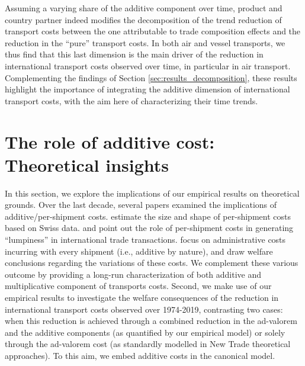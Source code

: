 \documentclass[a4paper,11pt]{article}
\begin{document}
Assuming a varying share of the additive component over time, product and country partner indeed modifies the decomposition of the trend reduction of transport costs between the one attributable to trade composition effects and the reduction in the ``pure'' transport costs.
In both air and vessel transports, we thus find that this last dimension is the main driver of the reduction in international transport costs observed over time, in particular in air transport.
Complementing the findings of Section \ref{sec:results_decomposition}, these results highlight the importance of integrating the additive dimension of international transport costs, with the aim here of characterizing their time trends.

\section{The role of additive cost: Theoretical insights}\label{sec:theory}


In this section, we explore the implications of our empirical results on theoretical grounds. Over the last decade, several papers examined the implications of additive/per-shipment costs. \cite{Kropf-Saure-JIE-2016} estimate the size and shape of per-shipment costs based on Swiss data. \cite{Alessandria-et-al-AER-2010} and \cite{Hornok-et-al-RES-2015} point out the role of per-shipment costs in generating ``lumpiness'' in international trade transactions. \cite{Hornok-et-al-JIE-2015} focus on administrative costs incurring with every shipment (i.e., additive by nature), and draw welfare conclusions regarding the variations of these costs. We complement these various outcome by providing a long-run characterization of both additive and multiplicative component of transports costs. Second, we make use of our empirical results to investigate the welfare consequences of the reduction in international transport costs observed over 1974-2019, contrasting two cases: when this reduction is achieved through a combined reduction in the ad-valorem and the additive components (as quantified by our empirical model) or solely through the ad-valorem cost (as standardly modelled in New Trade theoretical approaches). To this aim, we embed additive costs in the canonical \citet{melitz} model.\smallskip
\end{document}
